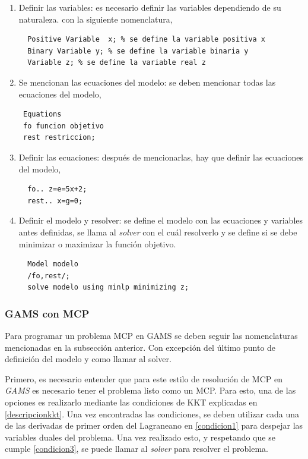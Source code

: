 \begin{enumerate}
   \item Definir las variables: es necesario definir las variables dependiendo de su naturaleza. con la siguiente nomenclatura,
   \begin{lstlisting}
  Positive Variable  x; % se define la variable positiva x
  Binary Variable y; % se define la variable binaria y
  Variable z; % se define la variable real z
   \end{lstlisting}
   \item Se mencionan las ecuaciones del modelo: se deben mencionar todas las ecuaciones del modelo, 
   \begin{lstlisting}
 Equations
 fo funcion objetivo
 rest restriccion;
  \end{lstlisting}
  \item Definir las ecuaciones: después de mencionarlas, hay que definir las ecuaciones del modelo,
  \begin{lstlisting}
  fo.. z=e=5x+2;
  rest.. x=g=0;
  \end{lstlisting}
  
  \item  Definir el modelo y resolver: se define el modelo con las ecuaciones y variables antes definidas, se llama al \textit{solver} con el cuál resolverlo y se define si se debe minimizar o maximizar la función objetivo. 
  \begin{lstlisting}
  Model modelo
  /fo,rest/;
  solve modelo using minlp minimizing z;
  \end{lstlisting}
\end{enumerate}


\subsubsection{GAMS con MCP}

Para programar un problema MCP en GAMS se deben seguir las nomenclaturas mencionadas en la subsección anterior. Con excepción del último punto de definición del modelo y como llamar al solver. 

Primero, es necesario entender que para este estilo de resolución de MCP en \textit{GAMS} es necesario tener el problema listo como un MCP. Para esto, una de las opciones es realizarlo mediante las condiciones de KKT explicadas en \ref{descripcionkkt}. Una vez encontradas las condiciones, se deben utilizar cada una de las derivadas de primer orden del Lagraneano en \ref{condicion1} para despejar las variables duales del problema. Una vez realizado esto, y respetando que se cumple \ref{condicion3}, se puede llamar al \textit{solver} para resolver el problema. 

